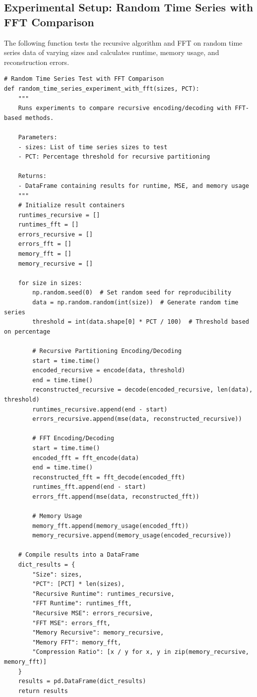 \documentclass[onecolumn,conference]{IEEEtran}
\begin{document}
\subsection{Experimental Setup: Random Time Series with FFT Comparison}
The following function tests the recursive algorithm and FFT on random time series data of varying sizes and calculates runtime, memory usage, and reconstruction errors.

\begin{verbatim}
# Random Time Series Test with FFT Comparison
def random_time_series_experiment_with_fft(sizes, PCT):
    """
    Runs experiments to compare recursive encoding/decoding with FFT-based methods.

    Parameters:
    - sizes: List of time series sizes to test
    - PCT: Percentage threshold for recursive partitioning

    Returns:
    - DataFrame containing results for runtime, MSE, and memory usage
    """
    # Initialize result containers
    runtimes_recursive = []
    runtimes_fft = []
    errors_recursive = []
    errors_fft = []
    memory_fft = []
    memory_recursive = []

    for size in sizes:
        np.random.seed(0)  # Set random seed for reproducibility
        data = np.random.random(int(size))  # Generate random time series
        threshold = int(data.shape[0] * PCT / 100)  # Threshold based on percentage

        # Recursive Partitioning Encoding/Decoding
        start = time.time()
        encoded_recursive = encode(data, threshold)
        end = time.time()
        reconstructed_recursive = decode(encoded_recursive, len(data), threshold)
        runtimes_recursive.append(end - start)
        errors_recursive.append(mse(data, reconstructed_recursive))

        # FFT Encoding/Decoding
        start = time.time()
        encoded_fft = fft_encode(data)
        end = time.time()
        reconstructed_fft = fft_decode(encoded_fft)
        runtimes_fft.append(end - start)
        errors_fft.append(mse(data, reconstructed_fft))

        # Memory Usage
        memory_fft.append(memory_usage(encoded_fft))
        memory_recursive.append(memory_usage(encoded_recursive))

    # Compile results into a DataFrame
    dict_results = {
        "Size": sizes,
        "PCT": [PCT] * len(sizes),
        "Recursive Runtime": runtimes_recursive,
        "FFT Runtime": runtimes_fft,
        "Recursive MSE": errors_recursive,
        "FFT MSE": errors_fft,
        "Memory Recursive": memory_recursive,
        "Memory FFT": memory_fft,
        "Compression Ratio": [x / y for x, y in zip(memory_recursive, memory_fft)]
    }
    results = pd.DataFrame(dict_results)
    return results
\end{verbatim}
\end{document}
